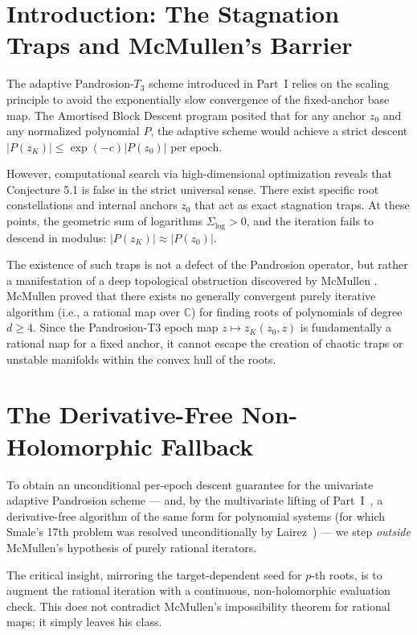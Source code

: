 \documentclass[11pt,a4paper]{article}
\begin{document}
\section{Introduction: The Stagnation Traps and McMullen's Barrier}
The adaptive Pandrosion-$T_3$ scheme introduced in Part~I relies on the scaling principle to avoid the exponentially slow convergence of the fixed-anchor base map. The Amortised Block Descent program posited that for any anchor $z_0$ and any normalized polynomial $P$, the adaptive scheme would achieve a strict descent $|P(z_K)| \le \exp(-c)|P(z_0)|$ per epoch.

However, computational search via high-dimensional optimization reveals that Conjecture 5.1 is false in the strict universal sense. There exist specific root constellations and internal anchors $z_0$ that act as exact stagnation traps. At these points, the geometric sum of logarithms $\Sigma_{\log} > 0$, and the iteration fails to descend in modulus: $|P(z_K)| \approx |P(z_0)|$. 

The existence of such traps is not a defect of the Pandrosion operator, but rather a manifestation of a deep topological obstruction discovered by McMullen \cite{mcmullen}. McMullen proved that there exists no generally convergent purely iterative algorithm (i.e., a rational map over $\mathbb{C}$) for finding roots of polynomials of degree $d \ge 4$. Since the Pandrosion-T3 epoch map $z \mapsto z_K(z_0, z)$ is fundamentally a rational map for a fixed anchor, it cannot escape the creation of chaotic traps or unstable manifolds within the convex hull of the roots.

\section{The Derivative-Free Non-Holomorphic Fallback}
To obtain an unconditional per-epoch descent guarantee for the univariate adaptive Pandrosion scheme --- and, by the multivariate lifting of Part~I~\cite[\S 3.5]{besevic1}, a derivative-free algorithm of the same form for polynomial systems (for which Smale's 17th problem was resolved unconditionally by Lairez~\cite{lairez}) --- we step \emph{outside} McMullen's hypothesis of purely rational iterators.

The critical insight, mirroring the target-dependent seed for $p$-th roots, is to augment the rational iteration with a continuous, non-holomorphic evaluation check. This does not contradict McMullen's impossibility theorem for rational maps; it simply leaves his class.
\end{document}

